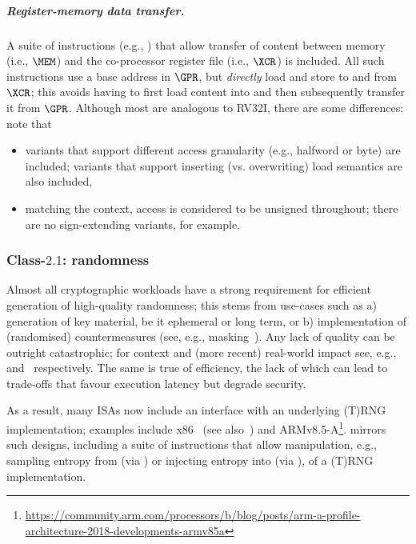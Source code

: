 \subparagraph{Register-memory   data transfer.}

A suite of instructions 
(e.g., )
that allow 
transfer of content between
   memory                         (i.e., $\MEM$)
and
the    co-processor register file (i.e., $\XCR$)
is included.
All such instructions use a base address in $\GPR$, but {\em directly} load 
and store to and from $\XCR$; this avoids having to first load content into 
and then subsequently transfer it from $\GPR$.
Although most are analogous to RV32I, there are some differences: note that

\begin{itemize}
\item variants that support different access granularity (e.g., halfword or
      byte) are included; variants that support inserting (vs. overwriting)
      load semantics are also included,
\item matching the context, access is considered to be unsigned throughout;
      there are no sign-extending variants, for example.
\end{itemize}


\subsubsection{Class-$2.1$: randomness}
\label{sec:bg:feature:2:1}

Almost all cryptographic workloads have a strong requirement for efficient
generation of high-quality randomness; this stems from use-cases such as
a) generation of key material, be it ephemeral or long term,
   or
b) implementation of (randomised) countermeasures
   (see, e.g., masking~\cite[Chapter 9]{SCARV:ManOswPop:07}).
Any lack of quality can be outright catastrophic;
for context and (more recent) real-world impact see, e.g.,~\cite{SCARV:KSWH:98,SCARV:RFC:4086} and~\cite{SCARV:NSSKM:17} respectively.
The same is true of efficiency, the lack of which can lead to trade-offs 
that favour execution latency but degrade security.

As a result, many ISAs now include an interface with an underlying (T)RNG
implementation; examples include
x86~\cite[Section 7.3.17.1 and 7.3.17.2]{SCARV:X86:2:18} (see also~\cite{SCARV:JunKoc:99,SCARV:HamKocMar:12})
and
ARMv8.5-A\footnote{
\url{https://community.arm.com/processors/b/blog/posts/arm-a-profile-architecture-2018-developments-armv85a}
}.  \XCID mirrors such designs, including
a suite of instructions 
that allow 
manipulation, e.g.,
 sampling entropy from (via )
or
injecting entropy into (via ),
of a (T)RNG implementation.

